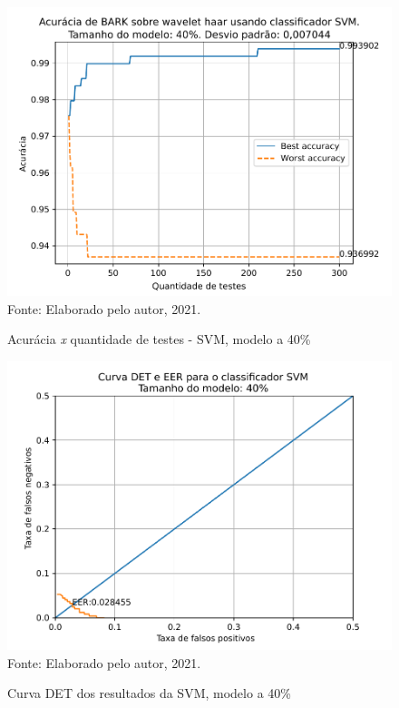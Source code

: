 			\begin{figure}[H]
				\centering
				\caption{Acurácia \textit{x} quantidade de testes - SVM, modelo a 40\%}
				\includegraphics[width=.9\linewidth]{images/results/confusionMatrices/classifier_SVM_40}
				\label{fig:classifiersvm40}
				\\Fonte: Elaborado pelo autor, 2021.
			\end{figure}
		
			\begin{figure}[H]
				\centering
				\caption{Curva DET dos resultados da SVM, modelo a 40\%}
				\includegraphics[width=.9\linewidth]{images/results/det/DET_for_classifier_SVM_40}
				\label{fig:detsvm40}
				\\Fonte: Elaborado pelo autor, 2021.
			\end{figure}

